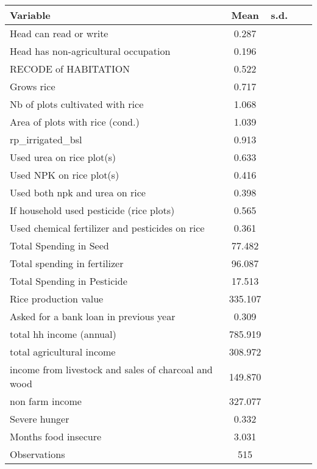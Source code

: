 \begin{tabular}{lcccc}\hline Variable & Mean & s.d.\\
\hline
Head can read or write&       0.287\\
Head has non-agricultural occupation&       0.196\\
RECODE of HABITATION&       0.522\\
Grows rice          &       0.717\\
Nb of plots cultivated with rice&       1.068\\
Area of plots with rice (cond.)&       1.039\\
rp\_irrigated\_bsl    &       0.913\\
Used urea on rice plot(s)&       0.633\\
Used NPK on rice plot(s)&       0.416\\
Used both npk and urea on rice&       0.398\\
If household used pesticide (rice plots)&       0.565\\
Used chemical fertilizer and pesticides on rice&       0.361\\
Total Spending in Seed&      77.482\\
Total spending in fertilizer&      96.087\\
Total Spending in Pesticide&      17.513\\
Rice production value&     335.107\\
Asked for a bank loan in previous year&       0.309\\
total hh income (annual)&     785.919\\
total agricultural income&     308.972\\
income from livestock and sales of charcoal and wood&     149.870\\
non farm income     &     327.077\\
Severe hunger       &       0.332\\
Months food insecure&       3.031\\
\hline
Observations        &         515\\
\hline\hline
\end{tabular}
